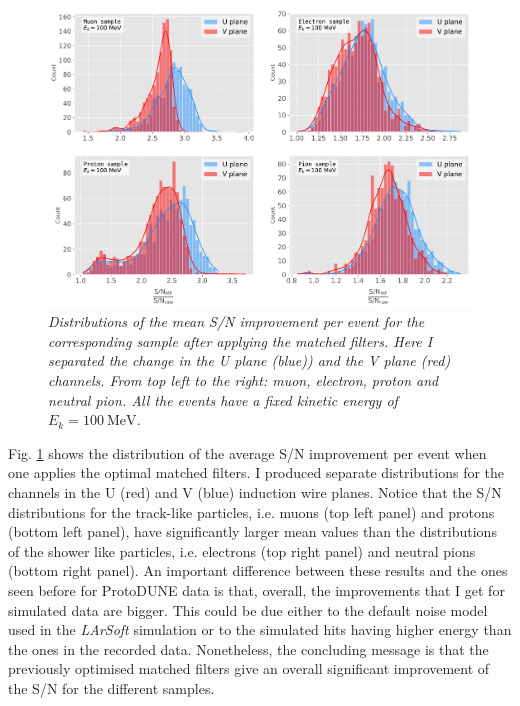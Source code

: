 \begin{figure}[h!]
	\centering
	\includegraphics[width=0.9\linewidth]{Images/Matched_Filter/larsoft_sn_hists.pdf}
	\caption{\textit{Distributions of the mean S/N improvement per event for the corresponding sample after applying the matched filters. Here I separated the change in the U plane (blue)) and the V plane (red) channels. From top left to the right: muon, electron, proton and neutral pion. All the events have a fixed kinetic energy of $E_{k} = 100 \ \mathrm{MeV}$.}}
	\label{fig:mono_summary_hist}
\end{figure}

Fig. \ref{fig:mono_summary_hist} shows the distribution of the average S/N improvement per event when one applies the optimal matched filters. I produced separate distributions for the channels in the U (red) and V (blue) induction wire planes. Notice that the S/N distributions for the track-like particles, i.e. muons (top left panel) and protons (bottom left panel), have significantly larger mean values than the distributions of the shower like particles, i.e. electrons (top right panel) and neutral pions (bottom right panel). An important difference between these results and the ones seen before for ProtoDUNE data is that, overall, the improvements that I get for simulated data are bigger. This could be due either to the default noise model used in the \textit{LArSoft} simulation or to the simulated hits having higher energy than the ones in the recorded data. Nonetheless, the concluding message is that the previously optimised matched filters give an overall significant improvement of the S/N for the different samples.

